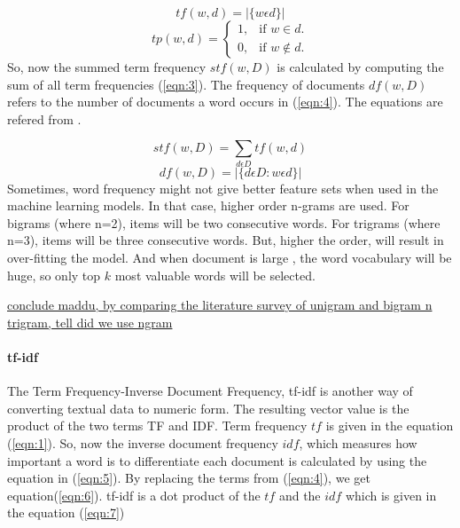 \begin{equation}
\label{eqn:1}
tf(w,d) = |\{w \epsilon d\}|
\end{equation}
\begin{equation}
\label{eqn:2}
  tp(w,d)=\begin{cases}
    1, & \text{if $w \in d$}.\\
    0, & \text{if $w \not\in d$}.
  \end{cases}
\end{equation}
So, now the summed term frequency $stf(w,D)$ is calculated by computing the sum of all term frequencies (\ref{eqn:3}). The frequency of documents $df(w,D)$ refers to the number of documents a word occurs in (\ref{eqn:4}). The equations are refered from \cite{groot2012data}.

\begin{equation}
\label{eqn:3}
stf(w,D) = \sum_{d \epsilon D} tf(w,d)
\end{equation}
\begin{equation}
\label{eqn:4}
df(w,D) = |\{d \epsilon D: w \epsilon d \}|
\end{equation}
Sometimes, word frequency might not give better feature sets when used in the machine learning models. In that case, higher order n-grams are used. For bigrams (where n=2), items will be two consecutive words. For trigrams (where n=3), items will be three consecutive words. But, higher the order, will result in over-fitting the model. And when document is large , the word vocabulary will be huge, so only top $k$ most valuable words will be selected.

\underline{conclude maddu, by comparing the literature survey of unigram and bigram n trigram, tell did we use ngram}


\paragraph{tf-idf}
The Term Frequency-Inverse Document Frequency, tf-idf is another way of converting textual data to numeric form. The resulting vector value is the product of the two terms TF and IDF. Term frequency $tf$ is given in the equation (\ref{eqn:1}). So, now the inverse document frequency $idf$, which measures how important a word is to differentiate each document is calculated by using the equation in (\ref{eqn:5}). By replacing the terms from (\ref{eqn:4}), we get equation(\ref{eqn:6}). tf-idf is a dot product of the $tf$ and the $idf$ which is given in the equation (\ref{eqn:7})

